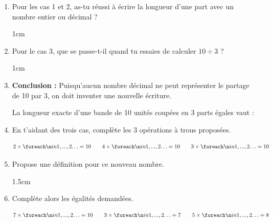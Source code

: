 \documentclass[a4paper]{book}
\begin{document}
    
    \begin{exercice}
        \begin{enumerate}
            \item Pour les cas 1 et 2, as-tu réussi à écrire la longueur d'une part avec un nombre entier ou décimal ? 

            \begin{ZoneReponse}{1cm}
            \end{ZoneReponse}
            
            \item Pour le cas 3, que se passe-t-il quand tu essaies de calculer $10 \div 3$ ? 
            
            \begin{ZoneReponse}{1cm}
            \end{ZoneReponse}
            
            \item \textbf{Conclusion :} Puisqu'aucun nombre décimal ne peut représenter le partage de 10 par 3, on doit inventer une nouvelle écriture. 
            
            \begin{center}
                La longueur exacte d'une bande de 10 unités coupées en 3 parts égales vaut : \points[3]
            \end{center}

            \item En t'aidant des trois cas, complète les 3 opérations à trous proposées.

            \[2\times\points[2]=10 \quad \quad 4\times\points[2]=10 \quad \quad 3\times\points[2]=10 \]

            \item Propose une définition pour ce nouveau nombre.

            \begin{ZoneReponse}{1.5cm}
            \end{ZoneReponse}

            \item Complète alors les égalités demandées.

            \[7\times\points[2]=10 \quad \quad 3\times\points[2]=7 \quad \quad 5\times\points[2]=8 \]
            
        \end{enumerate}
    \end{exercice}
    
\end{document}
